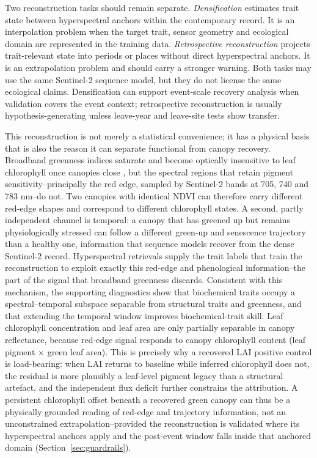 \documentclass[pdflatex,sn-mathphys-num]{sn-jnl}
\begin{document}
Two reconstruction tasks should remain separate. \textit{Densification} estimates trait state between hyperspectral anchors within the contemporary record. It is an interpolation problem when the target trait, sensor geometry and ecological domain are represented in the training data. \textit{Retrospective reconstruction} projects trait-relevant state into periods or places without direct hyperspectral anchors. It is an extrapolation problem and should carry a stronger warning. Both tasks may use the same Sentinel-2 sequence model, but they do not license the same ecological claims. Densification can support event-scale recovery analysis when validation covers the event context; retrospective reconstruction is usually hypothesis-generating unless leave-year and leave-site tests show transfer.

This reconstruction is not merely a statistical convenience; it has a physical basis that is also the reason it can separate functional from canopy recovery. Broadband greenness indices saturate and become optically insensitive to leaf chlorophyll once canopies close \cite{gitelson1997chlorophyll,gitelson2004wdrvi,gitelson2005canopychlorophyll,gao2023visaturation,tian2025ndvisaturation}, but the spectral regions that retain pigment sensitivity--principally the red edge, sampled by Sentinel-2 bands at 705, 740 and 783 nm--do not. Two canopies with identical NDVI can therefore carry different red-edge shapes and correspond to different chlorophyll states. A second, partly independent channel is temporal: a canopy that has greened up but remains physiologically stressed can follow a different green-up and senescence trajectory than a healthy one, information that sequence models recover from the dense Sentinel-2 record. Hyperspectral retrievals supply the trait labels that train the reconstruction to exploit exactly this red-edge and phenological information--the part of the signal that broadband greenness discards. Consistent with this mechanism, the supporting diagnostics show that biochemical traits occupy a spectral--temporal subspace separable from structural traits and greenness, and that extending the temporal window improves biochemical-trait skill. Leaf chlorophyll concentration and leaf area are only partially separable in canopy reflectance, because red-edge signal responds to canopy chlorophyll content (leaf pigment $\times$ green leaf area). This is precisely why a recovered LAI positive control is load-bearing: when LAI returns to baseline while inferred chlorophyll does not, the residual is more plausibly a leaf-level pigment legacy than a structural artefact, and the independent flux deficit further constrains the attribution. A persistent chlorophyll offset beneath a recovered green canopy can thus be a physically grounded reading of red-edge and trajectory information, not an unconstrained extrapolation--provided the reconstruction is validated where its hyperspectral anchors apply and the post-event window falls inside that anchored domain (Section~\ref{sec:guardrails}).
\end{document}
